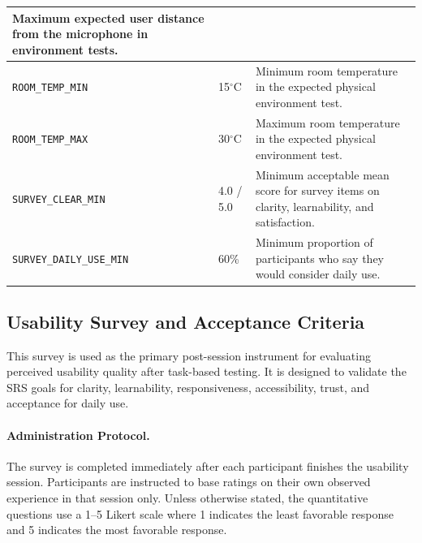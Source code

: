 \documentclass[12pt, titlepage]{article}
\begin{document}
\begin{table}[H]
\begin{tabularx}{\textwidth}{|p{5.2cm}|p{2.7cm}|X|}
Maximum expected user distance from the microphone in environment tests. \\
\hline
\texttt{ROOM\_TEMP\_MIN} & 15$^\circ$C &
Minimum room temperature in the expected physical environment test. \\
\hline
\texttt{ROOM\_TEMP\_MAX} & 30$^\circ$C &
Maximum room temperature in the expected physical environment test. \\
\hline
\texttt{SURVEY\_CLEAR\_MIN} & 4.0 / 5.0 &
Minimum acceptable mean score for survey items on clarity,
learnability, and satisfaction. \\
\hline
\texttt{SURVEY\_DAILY\_USE\_MIN} & 60\% &
Minimum proportion of participants who say they would consider daily use. \\
\hline
\end{tabularx}
\end{table}

\subsection{Usability Survey and Acceptance Criteria}

This survey is used as the primary post-session instrument for
evaluating perceived usability quality after task-based testing. It is
designed to validate the SRS goals for clarity, learnability,
responsiveness, accessibility, trust, and acceptance for daily use.

\paragraph{Administration Protocol.}
The survey is completed immediately after each participant finishes the
usability session. Participants are instructed to base ratings on their
own observed experience in that session only. Unless otherwise stated,
the quantitative questions use a 1--5 Likert scale where 1 indicates the
least favorable response and 5 indicates the most favorable response.
\end{document}
